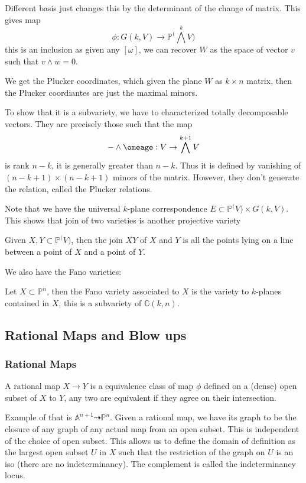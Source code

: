 \documentclass[main.tex]{subfiles}
\newcommand{\Pn}[1]{\mathbb{P}^{#1}}
\begin{document}
Different basis just changes this by the determinant of the change of matrix. This gives map 
$$
\phi: G(k, V) \rightarrow \Pn(\bigwedge^k V)
$$
this is an inclusion as given any $[\omega]$, we can recover $W$ as the space of vector $v$ such that $v \wedge w = 0$. 

We get the Plucker coordinates, which given the plane $W$ as $k \times n$ matrix, then the Plucker coordiantes are just the maximal minors. 

To show that it is a subvariety, we have to characterized totally decomposable vectors. They are precisely those such that the map 
$$
- \wedge \omeage: V \rightarrow \bigwedge^{k+1} V
$$
is rank $n-k$, it is generally greater than $n-k$. Thus it is defined by vanishing of $(n-k + 1) \times (n-k + 1)$ minors of the matrix. However, they don't generate the relation, called the Plucker relations. 

Note that we have the universal $k$-plane correspondence $E \subset \Pn(V) \times G(k, V)$. This shows that join of two varieties is another projective variety
\begin{example}
Given $X, Y \subset \Pn(V)$, then the join $\overline{XY}$ of $X$ and $Y$ is all the points lying on a line between a point of $X$ and a point of $Y$.
\end{example}

We also have the Fano varieties:
\begin{definition}
Let $X \subset \Pn{n}$, then the Fano variety associated to $X$ is the variety to $k$-planes contained in $X$, this is a subvariety of $\mathbb{G}(k,n)$. 
\end{definition}


\subsection{Rational Maps and Blow ups}

\subsubsection{Rational Maps}

A rational map $X \rightarrow Y$ is a equivalence class of map $\phi$ defined on a (dense) open subset of $X$ to $Y$, any two are equivalent if they agree on their intersection.

Example of that is $\mathbb{A}^{n+1} \dashrightarrow \Pn{n}$.
Given a rational map, we have its graph to be the closure of any graph of any actual map from an open subset. This is independent of the choice of open subset. This allows us to define the domain of definition as the largest open subset $U$ in $X$ such that the restriction of the graph on $U$ is an iso (there are no indeterminancy). The complement is called the indeterminancy locus.
\end{document}
